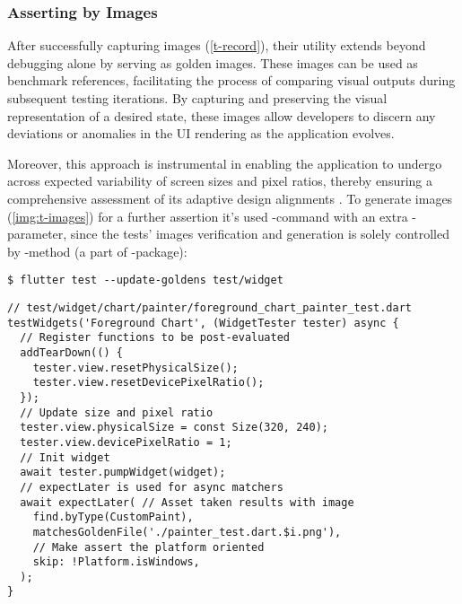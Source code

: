\subsubsection{Asserting by Images} \label{golden-image}

After successfully capturing images (\cref{t-record}), their utility extends beyond debugging alone by serving as 
golden images. These images can be used as benchmark references, facilitating the process of comparing visual 
outputs during subsequent testing iterations. By capturing and preserving the visual representation of a desired state, 
these images allow developers to discern any deviations or anomalies in the UI rendering as the application evolves. 

Moreover, this approach is instrumental in enabling the application to undergo across expected variability of screen 
sizes and pixel ratios, thereby ensuring a comprehensive assessment of its adaptive design alignments 
. To generate images (\cref{img:t-images}) for a further assertion it's used -command with 
an extra -parameter, since the tests' images verification and generation is solely controlled by
-method (a part of -package):

\begin{lstlisting}[language=terminal]
$ flutter test --update-goldens test/widget
\end{lstlisting}

\begin{lstlisting}
// test/widget/chart/painter/foreground_chart_painter_test.dart
testWidgets('Foreground Chart', (WidgetTester tester) async {
  // Register functions to be post-evaluated
  addTearDown(() {
    tester.view.resetPhysicalSize();
    tester.view.resetDevicePixelRatio();
  });
  // Update size and pixel ratio
  tester.view.physicalSize = const Size(320, 240);
  tester.view.devicePixelRatio = 1;
  // Init widget
  await tester.pumpWidget(widget);
  // expectLater is used for async matchers
  await expectLater( // Asset taken results with image
    find.byType(CustomPaint),
    matchesGoldenFile('./painter_test.dart.$i.png'),
    // Make assert the platform oriented
    skip: !Platform.isWindows,
  );
}
\end{lstlisting}


